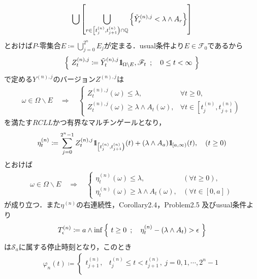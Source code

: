 \begin{prf}
\begin{description}
\begin{align}
					\bigcup \left[ \bigcup_{r \in \left[t^{(n)}_j, t^{(n)}_{j+1} \right)\cap\mathbb{Q}}\left\{\tilde{Y}^{(n),j}_r < \lambda \wedge A_r\right\} \right]
				\end{align}
				とおけば$P$-零集合$E \coloneqq \bigcup_{j=0}^{2^n} E_j$が定まる．usual条件より$E \in \mathscr{F}_0$であるから
				\begin{align}
					\left\{\ Z^{(n),j}_t \coloneqq \tilde{Y}^{(n),j}_t \mbox{1}\hspace{-0.25em}\mbox{l}_{\Omega \backslash E},
					\mathscr{F}_t\ \, ; \quad 0 \leq t < \infty\ \right\}
				\end{align}
				で定める$Y^{(n),j}$のバージョン$Z^{(n),j}$は
				\begin{align}
					\omega \in \Omega \backslash E
					\quad \Longrightarrow \quad
					\begin{cases}
						Z^{(n),j}_t(\omega) \leq \lambda, & \forall t \geq 0, \\
						Z^{(n),j}_t(\omega) \geq \lambda \wedge A_t(\omega), & \forall t \in \left[t^{(n)}_j, t^{(n)}_{j+1} \right)
					\end{cases}
				\end{align}
				を満たす$RCLL$かつ有界なマルチンゲールとなり，
				\begin{align}
					\eta^{(n)}_t \coloneqq
					\sum_{j=0}^{2^n-1} Z^{(n),j}_t \mbox{1}\hspace{-0.25em}\mbox{l}_{\left[t^{(n)}_j,t^{(n)}_{j+1}\right)}(t)
						+ (\lambda \wedge A_a) \mbox{1}\hspace{-0.25em}\mbox{l}_{[a,\infty)}(t),
					\quad (t \geq 0)
				\end{align}
				とおけば
				\begin{align}
					\omega \in \Omega \backslash E
					\quad \Longrightarrow \quad
					\begin{cases}
						\eta^{(n)}_t(\omega) \leq \lambda, & (\forall t \geq 0), \\
						\eta^{(n)}_t(\omega) \geq \lambda \wedge A_t(\omega), & (\forall t \in [0,a])
					\end{cases}
					\label{eq:chapter_1_theorem_4_14_4}
				\end{align}
				が成り立つ．また$\eta^{(n)}$の右連続性，Corollary2.4，Problem2.5 及びusual条件より
				\begin{align}
					T^{(n)}_\epsilon \coloneqq
					a \wedge \operatorname*{inf}_{} \left\{\ t \geq 0\ \, ; \quad \eta^{(n)}_t - (\lambda \wedge A_t)  > \epsilon\ \right\}
				\end{align}
				は$\mathscr{S}_a$に属する停止時刻となり，このとき
				\begin{align}
					\varphi_n(t) \coloneqq 
					\begin{cases}
						t^{(n)}_{j+1}, & t^{(n)}_j \leq t < t^{(n)}_{j+1},\ j=0,1,\cdots,2^n-1 \\

\end{cases}
\end{align}
\end{description}
\end{prf}
